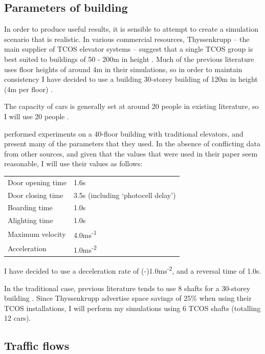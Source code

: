 \documentclass{UoYCSproject}
\begin{document}
\subsection{Parameters of building}

In order to produce useful results, it is sensible to attempt to create a simulation scenario that is realistic.  In various commercial resources, Thyssenkrupp -- the main supplier of TCOS elevator systems -- suggest that a single TCOS group is best suited to buildings of 50 - 200m in height \citep{ThyssenkruppFactSheet, ThyssenkruppWebsite}.  Much of the previous literature uses floor heights of around 4m in their simulations, so in order to maintain consistency I have decided to use a building 30-storey building of 120m in height (4m per floor) \citep{Brand2004, Nikovski2003, Rong2003}.

The capacity of cars is generally set at around 20 people in existing literature, so I will use 20 people \citep{Rong2003, Crites1996, Siikonen1993}.

\citet{Rong2003} performed experiments on a 40-floor building with traditional elevators, and present many of the parameters that they used.  In the absence of conflicting data from other sources, and given that the values that were used in their paper seem reasonable, I will use their values as follows:

\begin{tabular}{l l}
	Door opening time			& 1.6s \\
	Door closing time			& 3.5s (including `photocell delay') \\
	Boarding time				& 1.0s \\
	Alighting time				& 1.0s \\
	Maximum velocity			& 4.0ms\textsuperscript{-1} \\
	Acceleration				& 1.0ms\textsuperscript{-2}
\end{tabular}

I have decided to use a deceleration rate of (-)1.0ms\textsuperscript{-2}, and a reversal time of 1.0s.

In the traditional case, previous literature tends to use 8 shafts for a 30-storey building \citep{Siikonen1993, Nikovski2003, Brand2004}.  Since Thyssenkrupp advertise space savings of 25\% when using their TCOS installations, I will perform my simulations using 6 TCOS shafts (totalling 12 cars).

\subsection{Traffic flows}
\end{document}
